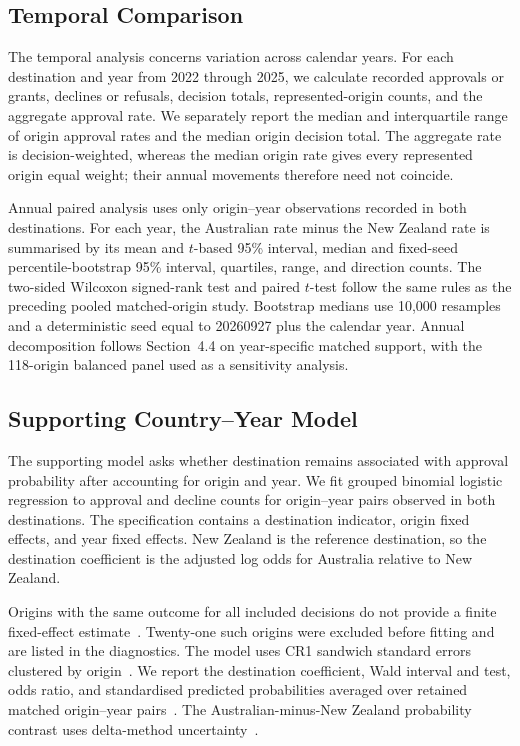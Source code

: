 \documentclass[runningheads]{llncs}
\begin{document}
\subsection{Temporal Comparison}

The temporal analysis concerns variation across calendar years. For each destination and year from 2022 through 2025, we calculate recorded approvals or grants, declines or refusals, decision totals, represented-origin counts, and the aggregate approval rate. We separately report the median and interquartile range of origin approval rates and the median origin decision total. The aggregate rate is decision-weighted, whereas the median origin rate gives every represented origin equal weight; their annual movements therefore need not coincide.

Annual paired analysis uses only origin--year observations recorded in both destinations. For each year, the Australian rate minus the New Zealand rate is summarised by its mean and $t$-based 95\% interval, median and fixed-seed percentile-bootstrap 95\% interval, quartiles, range, and direction counts. The two-sided Wilcoxon signed-rank test and paired $t$-test follow the same rules as the preceding pooled matched-origin study. Bootstrap medians use 10,000 resamples and a deterministic seed equal to 20260927 plus the calendar year. Annual decomposition follows Section~4.4 on year-specific matched support, with the 118-origin balanced panel used as a sensitivity analysis.

\subsection{Supporting Country--Year Model}

The supporting model asks whether destination remains associated with approval probability after accounting for origin and year. We fit grouped binomial logistic regression to approval and decline counts for origin--year pairs observed in both destinations. The specification contains a destination indicator, origin fixed effects, and year fixed effects. New Zealand is the reference destination, so the destination coefficient is the adjusted log odds for Australia relative to New Zealand.

Origins with the same outcome for all included decisions do not provide a finite fixed-effect estimate~\cite{AlbertAnderson1984}. Twenty-one such origins were excluded before fitting and are listed in the diagnostics. The model uses CR1 sandwich standard errors clustered by origin~\cite{CameronMiller2015}. We report the destination coefficient, Wald interval and test, odds ratio, and standardised predicted probabilities averaged over retained matched origin--year pairs~\cite{MullerMacLehose2014}. The Australian-minus-New Zealand probability contrast uses delta-method uncertainty~\cite{Oehlert1992}.
\end{document}
